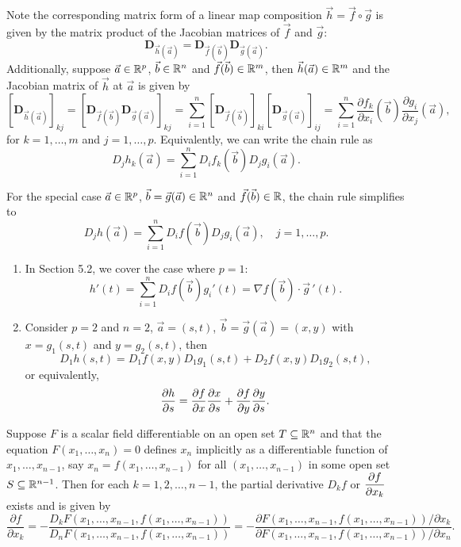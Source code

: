 \documentclass[a4paper]{ctexart}
\begin{document}
    \begin{myrmk}
        Note the corresponding matrix form of a linear map composition $\vec h = \vec f \circ \vec g$ is given by the matrix product of the Jacobian matrices of $\vec f$ and $\vec g$:
        $$ \mathbf D_{\vec h(\vec a)} = \mathbf D_{\vec f(\vec b)} \mathbf D_{\vec g(\vec a)}. $$
        Additionally, suppose $\vec a \in \mathbb{R}^p$, $\vec b \in \mathbb{R}^n$ and $\vec f(\vec b) \in \mathbb{R}^m$, then $\vec h(\vec a) \in \mathbb{R}^m$ and the Jacobian matrix of $\vec h$ at $\vec a$ is given by
        $$ \left[ \mathbf D_{\vec h(\vec a)} \right]_{kj} = \left[ \mathbf D_{\vec f(\vec b)} \mathbf D_{\vec g(\vec a)} \right]_{kj} = \sum_{i=1}^n \left[ \mathbf D_{\vec f(\vec b)} \right]_{ki} \left[ \mathbf D_{\vec g(\vec a)} \right]_{ij} = \sum_{i=1}^n \frac{\partial f_k}{\partial x_i}(\vec b) \frac{\partial g_i}{\partial x_j}(\vec a), $$
        for $k=1, \ldots, m$ and $j=1, \ldots, p$. Equivalently, we can write the chain rule as
        $$ D_j h_k(\vec a) = \sum_{i=1}^n D_i f_k(\vec b) D_j g_i(\vec a). $$
    \end{myrmk}
    \begin{myex}

        For the special case $\vec a\in \mathbb{R}^p$, $\vec b = \vec g(\vec a) \in \mathbb{R}^n$ and $\vec f(\vec b) \in \mathbb{R}$, the chain rule simplifies to
        $$ D_j h(\vec a) = \sum_{i=1}^n D_i f(\vec b) D_j g_i(\vec a),\quad j=1, \ldots, p. $$
        \begin{enumerate}[label=(\arabic*), start=1]
            \item In Section 5.2, we cover the case where $p=1$:
            $$ h'(t) = \sum_{i=1}^n D_i f(\vec b) g_i'(t) = \nabla f(\vec b) \cdot \vec g\,'(t). $$
            \item Consider $p=2$ and $n=2$, $\vec a = (s,t)$, $\vec b = \vec g(\vec a) = (x,y)$ with $x = g_1(s,t)$ and $y = g_2(s,t)$, then
            $$ D_1 h(s,t) = D_1 f(x,y) D_1 g_1(s,t) + D_2 f(x,y) D_1 g_2(s,t), $$
            or equivalently,
            $$ \pdv{h}{s} = \pdv{f}{x} \pdv{x}{s} + \pdv{f}{y} \pdv{y}{s}. $$
        \end{enumerate}
    \end{myex}
    \begin{mythm}
        Suppose $F$ is a scalar field differentiable on an open set $T\subseteq \mathbb{R}^n$ and that the equation $F(x_1, \ldots, x_n) = 0$ defines $x_n$ implicitly as a differentiable function of $x_1, \ldots, x_{n-1}$, say $x_n = f(x_1, \ldots, x_{n-1})$ for all $(x_1, \ldots, x_{n-1})$ in some open set $S\subseteq \mathbb{R}^{n-1}$. Then for each $k=1,2, \ldots, n-1$, the partial derivative $D_k f$ or $\displaystyle \pdv{f}{x_k}$ exists and is given by
        $$ \frac{\partial f}{\partial x_k} = -\frac{D_k F(x_1, \ldots, x_{n-1}, f(x_1, \ldots, x_{n-1}))}{D_n F(x_1, \ldots, x_{n-1}, f(x_1, \ldots, x_{n-1}))} = -\frac{\partial F(x_1, \ldots,x_{n-1}, f(x_1, \ldots, x_{n-1})) / \partial x_k}{\partial F(x_1, \ldots, x_{n-1}, f(x_1, \ldots, x_{n-1})) / \partial x_n}. $$
    \end{mythm}
\end{document}
